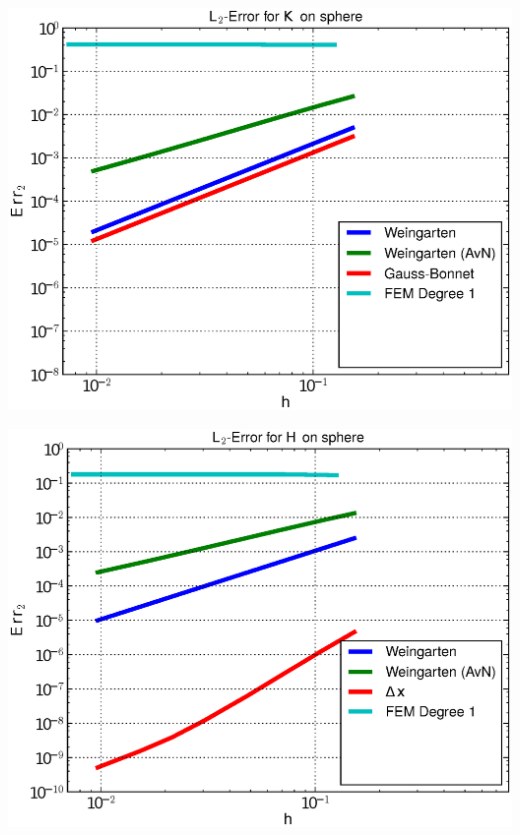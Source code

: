 \documentclass{beamer}
\begin{document}
\begin{frame}
\begin{overprint}
\begin{minipage}[t]{0.49\textwidth}
            \centering\includegraphics[width=\textwidth]{bilder/Curvature/sphere/ErrKL2_4.eps}
          \end{minipage}\hfill
          \begin{minipage}[t]{0.49\textwidth}
            \centering\includegraphics[width=\textwidth]{bilder/Curvature/sphere/ErrHL2_4.eps}
          \end{minipage}
          \begin{minipage}[t]{0.49\textwidth}

\end{minipage}
\end{overprint}
\end{frame}
\end{document}
